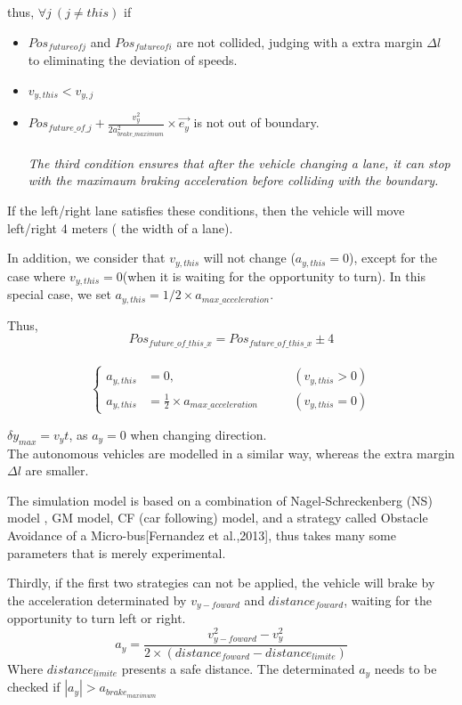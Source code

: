 \documentclass{mcmthesis}
\begin{document}
thus, $\forall j\ (j \neq this) $ if
\begin{itemize}
		\item $Pos_{future of j}$ and $ Pos_{future of i}$ are not collided, judging with a extra margin $\Delta l$ to eliminating the deviation of speeds.
		\item $v_{y,this} < v_{y,j} $
		\item $Pos_{future \_ of \_ j} + \frac{v_y^2}{2a_{brake \_ maximum}^2} \times \overrightarrow{e_y}$ is not out of boundary.
		\\ \\ \emph{The third condition ensures that after the vehicle changing a lane, it can stop with the maximaum braking acceleration before colliding with the boundary. }
\end{itemize}

If the left/right lane satisfies these conditions, then the vehicle will move left/right 4 meters ( the width of a lane).


In addition, we consider that $v_{y,this}$ will not change ($a_{y,this} = 0$), except for the case where $v_{y,this} = 0$(when it is waiting for the opportunity to turn). In this special case, we set $a_{y,this} = 1/2 \times a_{max \_ acceleration}$.

Thus, \\
$$Pos_{future\_of\_this\_x} = Pos_{future\_of\_this\_x} \pm 4$$\\
$$\left\{ 
\begin{aligned}
a_{y,this} &= 0 ,   \qquad& (v_{y,this} > 0)\\
a_{y,this} &= \frac{1}{2}\times a_{max \_ acceleration} \qquad &(v_{y,this} = 0)
\end{aligned}
\right.
$$

 $\delta y_{max}=v_yt$, as $a_y=0$ when changing direction.\\


The autonomous vehicles are modelled in a similar way, whereas the extra margin $\Delta l$ are smaller. 

The simulation model is based on a combination of Nagel-Schreckenberg (NS) model \cite{acelluar}, GM model, CF (car following) model, and a strategy called Obstacle Avoidance of a Micro-bus[Fernandez et al.,2013], thus takes many some parameters that is merely experimental.

Thirdly, if the first two strategies can not be applied, the vehicle will brake by the acceleration determinated by $v_{y-{foward}}$ and $distance_{foward}$, waiting for the opportunity to turn left or right.
$$
	a_y = \frac{v_{y-foward}^2 - v_y^2}{2\times(distance_{foward} - distance_{limite})}
$$
	Where $distance_{limite}$ presents a safe distance.
	The determinated $a_y$ needs to be checked if  $|a_y| > a_{brake_{maximum}} $ 
\end{document}
